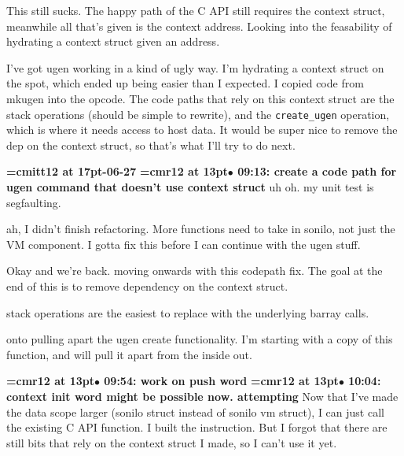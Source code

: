 This still sucks. The happy path of the C API still requires the context struct, meanwhile all that's given is the context address. Looking into the feasability of hydrating a context struct given an address.
\par

I've got ugen working in a kind of ugly way. I'm hydrating a context struct on the spot, which ended up being easier than I expected. I copied code from mkugen into the opcode. The code paths that rely on this context struct are the stack operations (should be simple to rewrite), and the {\tt create\_ugen} operation, which is where it needs access to host data. It would be super nice to remove the dep on the context struct, so that's what I'll try to do next.
\par

{\medskip\noindent\bf\font\titlefont=cmitt12 at 17pt-06-27}\medskip
{\smallskip\noindent\bf\font\titlefont=cmr12 at 13pt\titlefont $\bullet$ 09:13: create a code path for ugen command that doesn't use context struct}\smallskip
uh oh. my unit test is segfaulting.
\par

ah, I didn't finish refactoring. More functions need to take in sonilo, not just the VM component. I gotta fix this before I can continue with the ugen stuff.
\par

Okay and we're back. moving onwards with this codepath fix. The goal at the end of this is to remove dependency on the context struct.
\par

stack operations are the easiest to replace with the underlying barray calls.
\par

onto pulling apart the ugen create functionality. I'm starting with a copy of this function, and will pull it apart from the inside out.
\par

{\smallskip\noindent\bf\font\titlefont=cmr12 at 13pt\titlefont $\bullet$ 09:54: work on push word}\smallskip
{\smallskip\noindent\bf\font\titlefont=cmr12 at 13pt\titlefont $\bullet$ 10:04: context init word might be possible now. attempting}\smallskip
Now that I've made the data scope larger (sonilo struct instead of sonilo vm struct), I can just call the existing C API function. I built the instruction. But I forgot that there are still bits that rely on the context struct I made, so I can't use it yet.
\par

